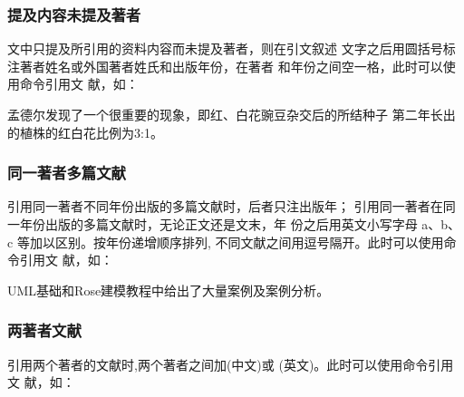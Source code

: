 \subsubsection{提及内容未提及著者}

文中只提及所引用的资料内容而未提及著者，则在引文叙述
文字之后用圆括号标注著者姓名或外国著者姓氏和出版年份，在著者
和年份之间空一格，此时可以使用命令引用文
献，如：
%
\begin{center}
  \begin{minipage}[h]{0.9\linewidth}    
    \begin{texdemov}%
      孟德尔发现了一个很重要的现象，即红、白花豌豆杂交后的所结种子
      第二年长出的植株的红白花比例为3:1\cite{fzx1962}。%
    \end{texdemov}
  \end{minipage}
\end{center}%
%

\subsubsection{同一著者多篇文献}

引用同一著者不同年份出版的多篇文献时，后者只注出版年；
引用同一著者在同一年份出版的多篇文献时，无论正文还是文末，年
份之后用英文小写字母 a、b、c 等加以区别。按年份递增顺序排列,
不同文献之间用逗号隔开。此时可以使用命令引用文
献，如：

\begin{center}
  \begin{minipage}[h]{0.9\linewidth}    
    \begin{texdemov}%
      UML基础和Rose建模教程中给出了大量案例及案例分析\cite{蔡敏2006a--,蔡敏2006b--}。%
    \end{texdemov}
  \end{minipage}
\end{center}

\subsubsection{两著者文献}

引用两个著者的文献时,两个著者之间加(中文)或
(英文)。此时可以使用命令引用文
献，如：

